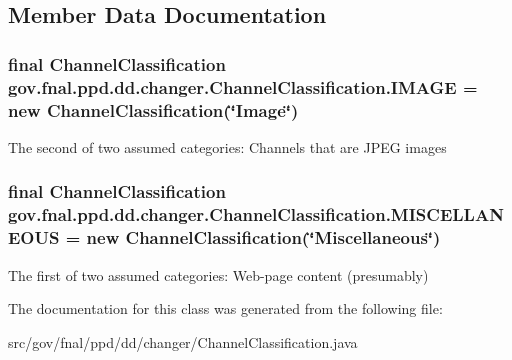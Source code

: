 \subsection{Member Data Documentation}
\hypertarget{classgov_1_1fnal_1_1ppd_1_1dd_1_1changer_1_1ChannelClassification_a368a93f6624e94cdd2a80b67e37d6187}{
\subsubsection[{I\-M\-A\-G\-E}]{\setlength{\rightskip}{0pt plus 5cm}final {\bf Channel\-Classification} gov.\-fnal.\-ppd.\-dd.\-changer.\-Channel\-Classification.\-I\-M\-A\-G\-E = new {\bf Channel\-Classification}(\char`\"{}Image\char`\"{})\hspace{0.3cm}{\ttfamily [static]}}}\label{classgov_1_1fnal_1_1ppd_1_1dd_1_1changer_1_1ChannelClassification_a368a93f6624e94cdd2a80b67e37d6187}
The second of two assumed categories\-: Channels that are J\-P\-E\-G images \hypertarget{classgov_1_1fnal_1_1ppd_1_1dd_1_1changer_1_1ChannelClassification_aff2ea773d09e0647abdcb5642bbbec0b}{
\subsubsection[{M\-I\-S\-C\-E\-L\-L\-A\-N\-E\-O\-U\-S}]{\setlength{\rightskip}{0pt plus 5cm}final {\bf Channel\-Classification} gov.\-fnal.\-ppd.\-dd.\-changer.\-Channel\-Classification.\-M\-I\-S\-C\-E\-L\-L\-A\-N\-E\-O\-U\-S = new {\bf Channel\-Classification}(\char`\"{}Miscellaneous\char`\"{})\hspace{0.3cm}{\ttfamily [static]}}}\label{classgov_1_1fnal_1_1ppd_1_1dd_1_1changer_1_1ChannelClassification_aff2ea773d09e0647abdcb5642bbbec0b}
The first of two assumed categories\-: Web-\/page content (presumably) 

The documentation for this class was generated from the following file\-:\begin{DoxyCompactItemize}
\item 
src/gov/fnal/ppd/dd/changer/Channel\-Classification.\-java\end{DoxyCompactItemize}
